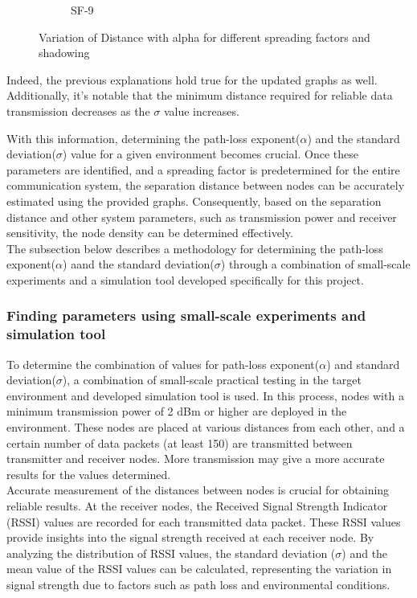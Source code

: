 \begin{figure}
\begin{subfigure}[b]{0.45\textwidth}
         \caption{SF-9}
         \label{fig:sf-9}
     \end{subfigure}
        \caption{Variation of Distance with alpha for different spreading factors and shadowing}
        \label{fig:initial graphs}
\end{figure}

Indeed, the previous explanations hold true for the updated graphs as well. Additionally, it's notable that the minimum distance required for reliable data transmission decreases as the $\sigma$ value increases.

With this information, determining the path-loss exponent($\alpha$) and the standard deviation($\sigma$) value for a given environment becomes crucial. Once these parameters are identified, and a spreading factor is predetermined for the entire communication system, the separation distance between nodes can be accurately estimated using the provided graphs. Consequently, based on the separation distance and other system parameters, such as transmission power and receiver sensitivity, the node density can be determined effectively.\\

The subsection below describes a methodology for determining the path-loss exponent($\alpha$) aand the standard deviation($\sigma$) through a combination of small-scale experiments and a simulation tool developed specifically for this project.

\subsubsection{Finding parameters using small-scale experiments and simulation tool}

To determine the combination of values for path-loss exponent($\alpha$) and standard deviation($\sigma$), a combination of small-scale practical testing in the target environment and developed simulation tool is used. In this process, nodes with a minimum transmission power of 2 dBm or higher are deployed in the environment. These nodes are placed at various distances from each other, and a certain number of data packets (at least 150) are transmitted between transmitter and receiver nodes. More transmission may give a more accurate results for the values determined.\\

Accurate measurement of the distances between nodes is crucial for obtaining reliable results. At the receiver nodes, the Received Signal Strength Indicator (RSSI) values are recorded for each transmitted data packet. These RSSI values provide insights into the signal strength received at each receiver node. By analyzing the distribution of RSSI values, the standard deviation ($\sigma$) and the mean value of the RSSI values can be calculated, representing the variation in signal strength due to factors such as path loss and environmental conditions.\\

